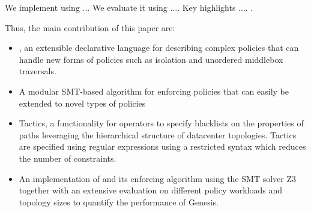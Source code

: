 We implement \Name using ... We evaluate it using .... Key highlights .... .

Thus, the main contribution of this paper are: 
\begin{itemize}
\item \Name, an extensible declarative language for describing complex policies that can
		handle new forms of policies such as isolation and unordered middlebox traversals.				
\item A modular SMT-based algorithm for enforcing \Name policies that can easily be extended
			to novel types of policies  
\item Tactics, a functionality for operators to specify blacklists on the properties of paths
 leveraging the hierarchical structure of datacenter topologies. 
 Tactics are specified using regular expressions using a restricted syntax which reduces the number of constraints.
\item An implementation of \Name and its enforcing algorithm using the SMT
		solver Z3 together with an extensive evaluation on different policy workloads and topology 
		sizes to quantify the performance of Genesis. 
\end{itemize}

